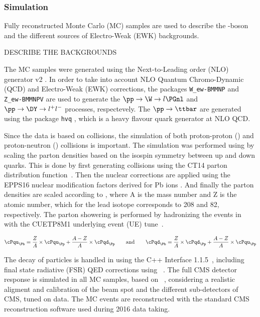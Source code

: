 \subsubsection{Simulation} \label{sec:WBoson_Analysis_MCSamples}

Fully reconstructed Monte Carlo (MC) samples are used to describe the \W-boson and the different sources of Electro-Weak (EWK) backgrounds.

DESCRIBE THE BACKGROUNDS

The MC samples were generated using the Next-to-Leading order (NLO) generator \POWHEG v2 \cite{POWHEG,POWHEG_2,POWHEGBOX}. In order to take into account NLO Quantum Chromo-Dynamic (QCD) and Electro-Weak (EWK) corrections, the \POWHEGBOX packages \verb#W_ew-BMMNP# \cite{POWHEGBOX_W_ew_BMNNP} and \verb#Z_ew-BMMNPV# \cite{POWHEGBOX_Z_ew_BMNNP} are used to generate the $\pp\to\W\to l\PGnl$ and $\pp\to\DY\to l^{+}l^{-}$ processes, respectevely. The $\pp\to\ttbar$ are generated using the \POWHEGBOX package \verb#hvq# \cite{POWHEGBOX_hvq}, which is a heavy flavour quark generator at NLO QCD. 

Since the data is based on \pPb collisions, the simulation of both proton-proton (\pp) and proton-neutron (\pn) collisions is important. The simulation was performed using \POWHEG by scaling the parton densities based on the isospin symmetry between up and down quarks. This is done by first generating \pp collisions using the CT14 parton distribution function~\cite{CT14}. Then the nuclear corrections are applied using the EPPS16 nuclear modification factors derived for Pb ions \cite{EPPS16}. And finally the parton densities are scaled according to , where A is the mass number and Z is the atomic number, which for the lead isotope corresponds to 208 and 82, respectively. The parton showering is performed by hadronizing the \POWHEG events in ~\cite{PYTHIA8} with the CUETP8M1 underlying event (UE) tune~\cite{PYTHIA_TUNE,UE_pp}.

\begin{equation}
\label{eq:PbScaling}
\cPqu_{\Pb} = \frac{Z}{A}\times{\cPqu_{\Pp}} + \frac{A-Z}{A}\times{\cPqd_{\Pp}}  \qquad\text{and}\qquad  \cPqd_{\Pb} = \frac{Z}{A}\times{\cPqd_{\Pp}} + \frac{A-Z}{A}\times{\cPqu_{\Pp}}
\end{equation}

The decay of \PGt particles is handled in \PYTHIA using the \TAUOLA C++ Interface 1.1.5~\cite{TAUOLA}, including final state radiative (FSR) QED corrections using~ \cite{PHOTOS}. The full CMS detector response is simulated in all MC samples, based on \GEANTfour~\cite{GEANT4}, considering a realistic aligment and calibration of the beam spot and the different sub-detectors of CMS, tuned on data. The MC events are reconstructed with the standard CMS \pp reconstruction software used during 2016 data taking.

